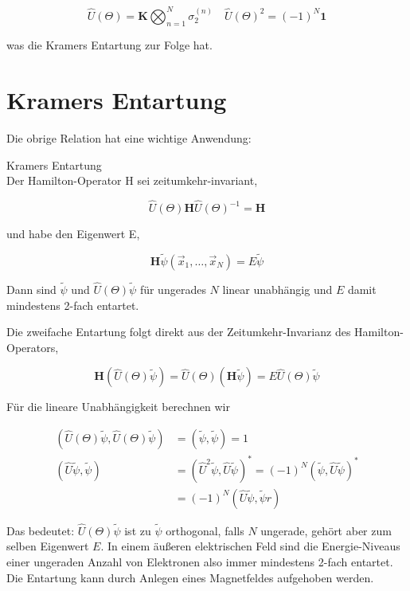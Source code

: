 \documentclass[10pt, letterpaper]{article}
\begin{document}
$$
\widehat{U}(\Theta)=\mathbf{K} \bigotimes_{n=1}^{N} \sigma_{2}^{(n)} \quad \widehat{U}(\Theta)^{2}=(-1)^{N} \mathbf{1}
$$

was die Kramers Entartung zur Folge hat.

\section*{Kramers Entartung}
Die obrige Relation hat eine wichtige Anwendung:

Kramers Entartung\\
Der Hamilton-Operator H sei zeitumkehr-invariant,

$$
\widehat{U}(\Theta) \mathbf{H} \widehat{U}(\Theta)^{-1}=\mathbf{H}
$$

und habe den Eigenwert E,

$$
\mathbf{H} \widetilde{\psi}\left(\vec{x}_{1}, \ldots, \vec{x}_{N}\right)=E \widetilde{\psi}
$$

Dann sind $\widetilde{\psi}$ und $\widehat{U}(\Theta) \widetilde{\psi}$ für ungerades $N$ linear unabhängig und $E$ damit mindestens 2-fach entartet.

Die zweifache Entartung folgt direkt aus der Zeitumkehr-Invarianz des Hamilton-Operators,

$$
\mathbf{H}(\widehat{U}(\Theta) \widetilde{\psi})=\widehat{U}(\Theta)(\mathbf{H} \widetilde{\psi})=E \widehat{U}(\Theta) \widetilde{\psi}
$$

Für die lineare Unabhängigkeit berechnen wir

$$
\begin{aligned}
(\widehat{U}(\Theta) \widetilde{\psi}, \widehat{U}(\Theta) \widetilde{\psi}) & =(\widetilde{\psi}, \widetilde{\psi})=1 \\
(\widehat{U} \widetilde{\psi}, \widetilde{\psi}) & =\left(\widehat{U}^{2} \widetilde{\psi}, \widehat{U} \widetilde{\psi}\right)^{*}=(-1)^{N}(\widetilde{\psi}, \widehat{U} \widetilde{\psi})^{*} \\
& =(-1)^{N}(\widehat{U} \widetilde{\psi}, \widetilde{\psi} r)
\end{aligned}
$$

Das bedeutet: $\widehat{U}(\Theta) \widetilde{\psi}$ ist zu $\widetilde{\psi}$ orthogonal, falls $N$ ungerade, gehört aber zum selben Eigenwert $E$. In einem äußeren elektrischen Feld sind die Energie-Niveaus einer ungeraden Anzahl von Elektronen also immer mindestens 2-fach entartet. Die Entartung kann durch Anlegen eines Magnetfeldes aufgehoben werden.
\end{document}

